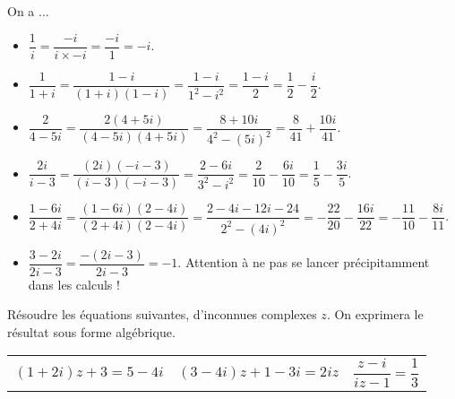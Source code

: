 \documentclass[11pt,fleqn, openany]{book} %
\begin{document}
\begin{solution}On a ...
\begin{itemize}
\item \( \dfrac{1}{i} = \dfrac{-i}{i \times -i} = \dfrac{-i}{1}=-i\).
\vskip5pt
\item \(\dfrac{1}{1+i} = \dfrac{1-i}{(1+i)(1-i)}=\dfrac{1-i}{1^2-i^2}=\dfrac{1-i}{2}=\dfrac{1}{2}-\dfrac{i}{2}\).
\vskip5pt
\item \(\dfrac{2}{4-5i} = \dfrac{2(4+5i)}{(4-5i)(4+5i)}=\dfrac{8+10i}{4^2-(5i)^2}=\dfrac{8}{41}+\dfrac{10i}{41}\).
\vskip5pt
\item \(\dfrac{2i}{i-3} = \dfrac{(2i)(-i-3)}{(i-3)(-i-3)}=\dfrac{2-6i}{3^2-i^2}=\dfrac{2}{10}-\dfrac{6i}{10}=\dfrac{1}{5}-\dfrac{3i}{5}\).
\vskip5pt
\item \(\dfrac{1-6i}{2+4i} = \dfrac{(1-6i)(2-4i)}{(2+4i)(2-4i)}=\dfrac{2-4i-12i-24}{2^2-(4i)^2}=-\dfrac{22}{20}-\dfrac{16i}{22}=-\dfrac{11}{10}-\dfrac{8i}{11}\).
\vskip5pt
\item \(\dfrac{3-2i}{2i-3}=\dfrac{-(2i-3)}{2i-3}=-1\). Attention à ne pas se lancer précipitamment dans les calculs !
\end{itemize}\end{solution}

\begin{exercise}[topic=cpx03]Résoudre les équations suivantes, d'inconnues complexes $z$. On exprimera le résultat sous forme algébrique.

\begin{tabularx}{\linewidth}{XXX}
$(1+2i)z+3=5-4i$ & $(3-4i)z+1-3i=2iz$ & $\dfrac{z-i}{iz-1}=\dfrac{1}{3}$
\end{tabularx}

\end{exercise}
\end{document}
